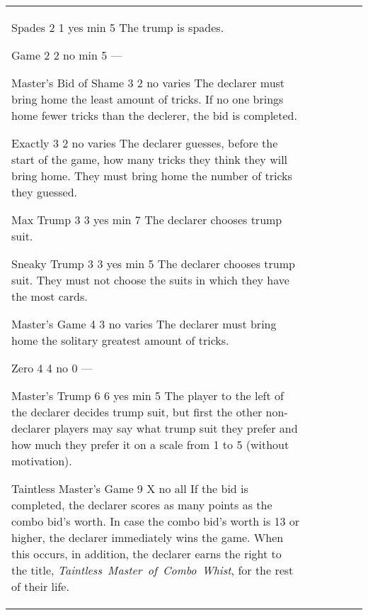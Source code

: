 \begin{table}
\begin{center}
\begin{tabularx}{\textwidth}{
			l
			S[table-number-alignment=center, table-format=1.0]
			S[table-number-alignment=center, table-format=1.0]
			cc|X
		}
				\standardBidItem%
				{Spades}
				{2}
				{1}
				{yes}
				{min 5}
				{%
					The trump is spades.
				}

				\standardBidItem%
				{Game}
				{2}
				{2}
				{no}
				{min 5}
				{%
					---
				}

				\standardBidItem%
				{Master's Bid of Shame}
				{3}
				{2}
				{no}
				{varies}
				{%
					The declarer must bring home the least amount of tricks. If no one brings home fewer tricks than the declerer, the bid is completed.
				}

				\standardBidItem%
				{Exactly}
				{3}
				{2}
				{no}
				{varies}
				{%
					The declarer guesses, before the start of the game, how many tricks they think they will bring home. They must bring home the number of tricks they guessed.
				}

				\standardBidItem%
				{Max Trump}
				{3}
				{3}
				{yes}
				{min 7}
				{%
					The declarer chooses trump suit.
				}

				\standardBidItem%
				{Sneaky Trump}
				{3}
				{3}
				{yes}
				{min 5}
				{%
					The declarer chooses trump suit. They must not choose the suits in which they have the most cards.
				}

				\standardBidItem%
				{Master's Game}
				{4}
				{3}
				{no}
				{varies}
				{%
					The declarer must bring home the solitary greatest amount of tricks.
				}

				\standardBidItem%
				{Zero}
				{4}
				{4}
				{no}
				{0}
				{%
					---
				}

				\standardBidItem%
				{Master's Trump}
				{6}
				{6}
				{yes}
				{min 5}
				{%
					The player to the left of the declarer decides trump suit, but first the other non-declarer players may say what trump suit they prefer and how much they prefer it on a scale from 1 to 5 (without motivation).
				}

				\standardBidItem%
				{Taintless Master's Game}
				{9}
				{X}
				{no}
				{all}
				{%
					If the bid is completed, the declarer scores as many points as the combo bid's worth. In case the combo bid's worth is 13 or higher, the declarer immediately wins the game. When this occurs, in addition, the declarer earns the right to the title, \emph{Taintless~Master~of~Combo~Whist}, for the rest of their life.
				}
		\end{tabularx}
	\end{center}
\end{table}
